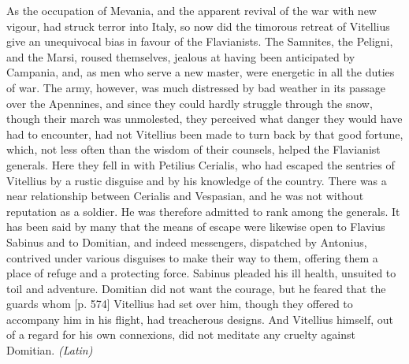 As the occupation of Mevania, and the apparent revival of the war with new vigour, had struck terror into Italy, so now did the timorous retreat of Vitellius give an unequivocal bias in favour of the Flavianists. The Samnites, the Peligni, and the Marsi, roused themselves, jealous at having been anticipated by Campania, and, as men who serve a new master, were energetic in all the duties of war. The army, however, was much distressed by bad weather in its passage over the Apennines, and since they could hardly struggle through the snow, though their march was unmolested, they perceived what danger they would have had to encounter, had not Vitellius been made to turn back by that good fortune, which, not less often than the wisdom of their counsels, helped the Flavianist generals. Here they fell in with Petilius Cerialis, who had escaped the sentries of Vitellius by a rustic disguise and by his knowledge of the country. There was a near relationship between Cerialis and Vespasian, and he was not without reputation as a soldier. He was therefore admitted to rank among the generals. It has been said by many that the means of escape were likewise open to Flavius Sabinus and to Domitian, and indeed messengers, dispatched by Antonius, contrived under various disguises to make their way to them, offering them a place of refuge and a protecting force. Sabinus pleaded his ill health, unsuited to toil and adventure. Domitian did not want the courage, but he feared that the guards whom [p. 574] Vitellius had set over him, though they offered to accompany him in his flight, had treacherous designs. And Vitellius himself, out of a regard for his own connexions, did not meditate any cruelty against Domitian. \emph{(Latin)}


